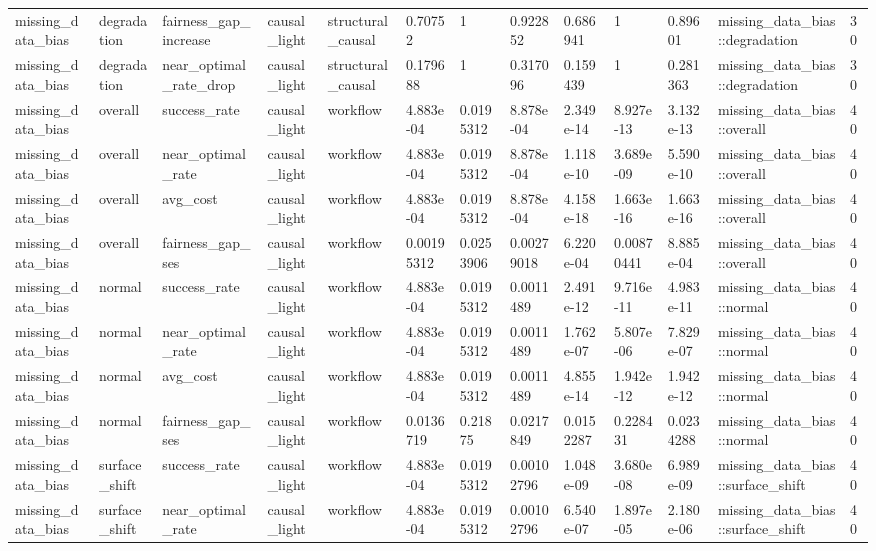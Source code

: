\begin{tabular}{lllllllllllll}
missing\_data\_bias & degradation & fairness\_gap\_increase & causal\_light & structural\_causal & 0.70752 & 1 & 0.922852 & 0.686941 & 1 & 0.89601 & missing\_data\_bias::degradation & 30 \\
missing\_data\_bias & degradation & near\_optimal\_rate\_drop & causal\_light & structural\_causal & 0.179688 & 1 & 0.317096 & 0.159439 & 1 & 0.281363 & missing\_data\_bias::degradation & 30 \\
missing\_data\_bias & overall & success\_rate & causal\_light & workflow & 4.883e-04 & 0.0195312 & 8.878e-04 & 2.349e-14 & 8.927e-13 & 3.132e-13 & missing\_data\_bias::overall & 40 \\
missing\_data\_bias & overall & near\_optimal\_rate & causal\_light & workflow & 4.883e-04 & 0.0195312 & 8.878e-04 & 1.118e-10 & 3.689e-09 & 5.590e-10 & missing\_data\_bias::overall & 40 \\
missing\_data\_bias & overall & avg\_cost & causal\_light & workflow & 4.883e-04 & 0.0195312 & 8.878e-04 & 4.158e-18 & 1.663e-16 & 1.663e-16 & missing\_data\_bias::overall & 40 \\
missing\_data\_bias & overall & fairness\_gap\_ses & causal\_light & workflow & 0.00195312 & 0.0253906 & 0.00279018 & 6.220e-04 & 0.00870441 & 8.885e-04 & missing\_data\_bias::overall & 40 \\
missing\_data\_bias & normal & success\_rate & causal\_light & workflow & 4.883e-04 & 0.0195312 & 0.0011489 & 2.491e-12 & 9.716e-11 & 4.983e-11 & missing\_data\_bias::normal & 40 \\
missing\_data\_bias & normal & near\_optimal\_rate & causal\_light & workflow & 4.883e-04 & 0.0195312 & 0.0011489 & 1.762e-07 & 5.807e-06 & 7.829e-07 & missing\_data\_bias::normal & 40 \\
missing\_data\_bias & normal & avg\_cost & causal\_light & workflow & 4.883e-04 & 0.0195312 & 0.0011489 & 4.855e-14 & 1.942e-12 & 1.942e-12 & missing\_data\_bias::normal & 40 \\
missing\_data\_bias & normal & fairness\_gap\_ses & causal\_light & workflow & 0.0136719 & 0.21875 & 0.0217849 & 0.0152287 & 0.228431 & 0.0234288 & missing\_data\_bias::normal & 40 \\
missing\_data\_bias & surface\_shift & success\_rate & causal\_light & workflow & 4.883e-04 & 0.0195312 & 0.00102796 & 1.048e-09 & 3.680e-08 & 6.989e-09 & missing\_data\_bias::surface\_shift & 40 \\
missing\_data\_bias & surface\_shift & near\_optimal\_rate & causal\_light & workflow & 4.883e-04 & 0.0195312 & 0.00102796 & 6.540e-07 & 1.897e-05 & 2.180e-06 & missing\_data\_bias::surface\_shift & 40 \\

\end{tabular}
